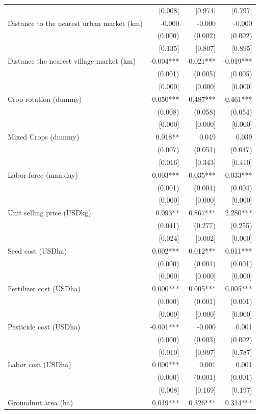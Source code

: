 \documentclass[
]{article}
\begin{document}
\begin{ThreePartTable}
\begin{longtable}[t]{lrrr}
 & {}[0.008] & {}[0.974] & {}[0.797]\\
Distance to the nearest urban market (km) & -0.000 & -0.000 & -0.000\\
 & (0.000) & (0.002) & (0.002)\\
 & {}[0.135] & {}[0.807] & {}[0.895]\\
Distance the nearest village market (km) & -0.004*** & -0.021*** & -0.019***\\
 & (0.001) & (0.005) & (0.005)\\
 & {}[0.000] & {}[0.000] & {}[0.000]\\
Crop rotation (dummy) & -0.050*** & -0.487*** & -0.461***\\
 & (0.008) & (0.058) & (0.054)\\
 & {}[0.000] & {}[0.000] & {}[0.000]\\
Mixed Crops (dummy) & 0.018** & 0.049 & 0.039\\
 & (0.007) & (0.051) & (0.047)\\
 & {}[0.016] & {}[0.343] & {}[0.410]\\
Labor force (man.day) & 0.003*** & 0.035*** & 0.033***\\
 & (0.001) & (0.004) & (0.004)\\
 & {}[0.000] & {}[0.000] & {}[0.000]\\
Unit selling price (USD\/kg) & 0.093** & 0.867*** & 2.280***\\
 & (0.041) & (0.277) & (0.255)\\
 & {}[0.024] & {}[0.002] & {}[0.000]\\
Seed cost (USD\/ha) & 0.002*** & 0.012*** & 0.011***\\
 & (0.000) & (0.001) & (0.001)\\
 & {}[0.000] & {}[0.000] & {}[0.000]\\
Fertilizer cost (USD\/ha) & 0.000*** & 0.005*** & 0.005***\\
 & (0.000) & (0.001) & (0.001)\\
 & {}[0.000] & {}[0.000] & {}[0.000]\\
Pesticide cost (USD\/ha) & -0.001*** & -0.000 & 0.001\\
 & (0.000) & (0.003) & (0.002)\\
 & {}[0.010] & {}[0.997] & {}[0.787]\\
Labor cost (USD\/ha) & 0.000*** & 0.001 & 0.001\\
 & (0.000) & (0.001) & (0.001)\\
 & {}[0.008] & {}[0.169] & {}[0.197]\\
Groundnut area (ha) & 0.019*** & 0.326*** & 0.314***\\

\end{longtable}
\end{ThreePartTable}
\end{document}
